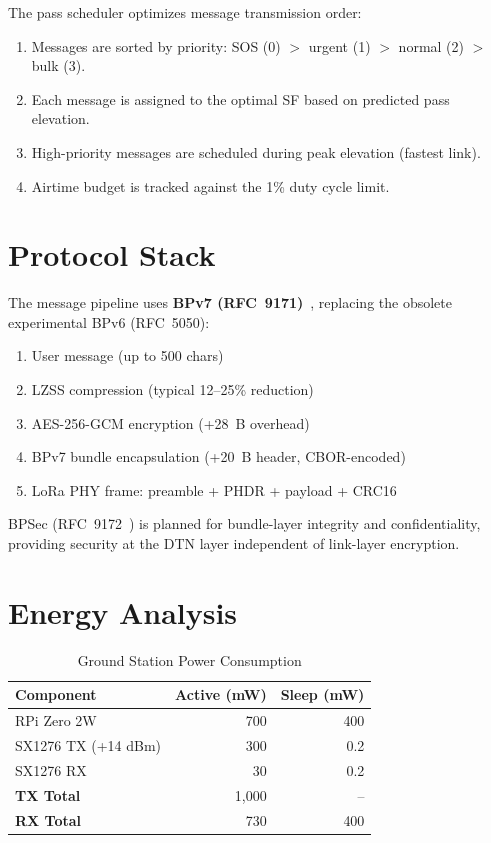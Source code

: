 \documentclass[11pt,a4paper]{article}
\begin{document}
The pass scheduler optimizes message transmission order:
\begin{enumerate}
    \item Messages are sorted by priority: SOS (0) $>$ urgent (1) $>$ normal (2) $>$ bulk (3).
    \item Each message is assigned to the optimal SF based on predicted pass elevation.
    \item High-priority messages are scheduled during peak elevation (fastest link).
    \item Airtime budget is tracked against the 1\% duty cycle limit.
\end{enumerate}

\section{Protocol Stack}
\label{sec:protocol}

The message pipeline uses \textbf{BPv7 (RFC~9171)}~\cite{rfc9171}, replacing the obsolete experimental BPv6 (RFC~5050):

\begin{enumerate}
    \item User message (up to 500 chars)
    \item LZSS compression (typical 12--25\% reduction)
    \item AES-256-GCM encryption (+28~B overhead)
    \item BPv7 bundle encapsulation (+20~B header, CBOR-encoded)
    \item LoRa PHY frame: preamble + PHDR + payload + CRC16
\end{enumerate}

BPSec (RFC~9172~\cite{rfc9172}) is planned for bundle-layer integrity and confidentiality, providing security at the DTN layer independent of link-layer encryption.

\section{Energy Analysis}
\label{sec:energy}

\begin{table}[H]
\centering
\caption{Ground Station Power Consumption}
\begin{tabular}{lrr}
\toprule
\textbf{Component} & \textbf{Active (mW)} & \textbf{Sleep (mW)} \\
\midrule
RPi Zero 2W & 700 & 400 \\
SX1276 TX (+14 dBm) & 300 & 0.2 \\
SX1276 RX & 30 & 0.2 \\
\midrule
\textbf{TX Total} & 1,000 & -- \\
\textbf{RX Total} & 730 & 400 \\
\bottomrule
\end{tabular}
\end{table}
\end{document}
